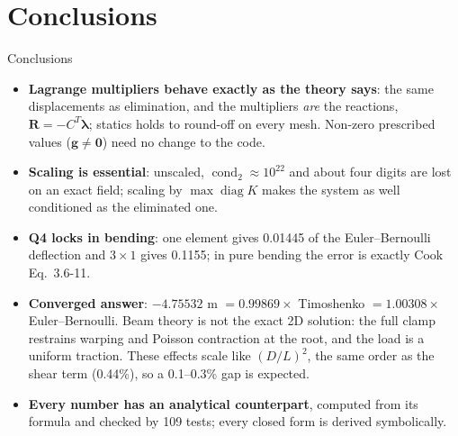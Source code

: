 \documentclass[aspectratio=169,10pt]{beamer}
\newcommand{\vg}{\mathbf g}
\newcommand{\vR}{\mathbf R}
\newcommand{\vlam}{\bm{\lambda}}
\begin{document}
\section{Conclusions}

\begin{frame}{Conclusions}
  \begin{itemize}
    \item \textbf{Lagrange multipliers behave exactly as the theory says}: the same displacements as elimination,
          and the multipliers \emph{are} the reactions, $\vR=-C^T\vlam$; statics holds to round-off on every mesh.
          Non-zero prescribed values ($\vg\ne\mathbf 0$) need no change to the code.
    \item \textbf{Scaling is essential}: unscaled, $\operatorname{cond}_2\approx10^{22}$ and about four digits are
          lost on an exact field; scaling by $\max\operatorname{diag}K$ makes the system as well conditioned as the
          eliminated one.
    \item \textbf{Q4 locks in bending}: one element gives 0.01445 of the Euler--Bernoulli deflection and $3\times1$
          gives 0.1155; in pure bending the error is exactly Cook Eq.~3.6-11.
    \item \textbf{Converged answer}: $-4.75532$ \textmu m $=0.99869\times$ Timoshenko $=1.00308\times$
          Euler--Bernoulli. Beam theory is not the exact 2D solution: the full clamp restrains warping and Poisson
          contraction at the root, and the load is a uniform traction. These effects scale like $(D/L)^2$, the
          same order as the shear term (0.44\%), so a 0.1--0.3\% gap is expected.
    \item \textbf{Every number has an analytical counterpart}, computed from its formula and checked by 109 tests;
          every closed form is derived symbolically.
  \end{itemize}
\end{frame}
\end{document}
